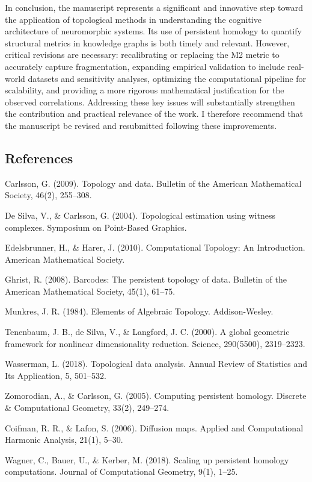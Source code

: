 \documentclass[12pt]{article}
\begin{document}
In conclusion, the manuscript represents a significant and innovative step toward the application of topological methods in understanding the cognitive architecture of neuromorphic systems. Its use of persistent homology to quantify structural metrics in knowledge graphs is both timely and relevant. However, critical revisions are necessary: recalibrating or replacing the M2 metric to accurately capture fragmentation, expanding empirical validation to include real-world datasets and sensitivity analyses, optimizing the computational pipeline for scalability, and providing a more rigorous mathematical justification for the observed correlations. Addressing these key issues will substantially strengthen the contribution and practical relevance of the work. I therefore recommend that the manuscript be revised and resubmitted following these improvements.

\hrulefill
\subsection{References}

Carlsson, G. (2009). Topology and data. Bulletin of the American Mathematical Society, 46(2), 255–308.

De Silva, V., \& Carlsson, G. (2004). Topological estimation using witness complexes. Symposium on Point-Based Graphics.

Edelsbrunner, H., \& Harer, J. (2010). Computational Topology: An Introduction. American Mathematical Society.

Ghrist, R. (2008). Barcodes: The persistent topology of data. Bulletin of the American Mathematical Society, 45(1), 61–75.

Munkres, J. R. (1984). Elements of Algebraic Topology. Addison-Wesley.

Tenenbaum, J. B., de Silva, V., \& Langford, J. C. (2000). A global geometric framework for nonlinear dimensionality reduction. Science, 290(5500), 2319–2323.

Wasserman, L. (2018). Topological data analysis. Annual Review of Statistics and Its Application, 5, 501–532.

Zomorodian, A., \& Carlsson, G. (2005). Computing persistent homology. Discrete \& Computational Geometry, 33(2), 249–274.

Coifman, R. R., \& Lafon, S. (2006). Diffusion maps. Applied and Computational Harmonic Analysis, 21(1), 5–30.

Wagner, C., Bauer, U., \& Kerber, M. (2018). Scaling up persistent homology computations. Journal of Computational Geometry, 9(1), 1–25.
\end{document}
